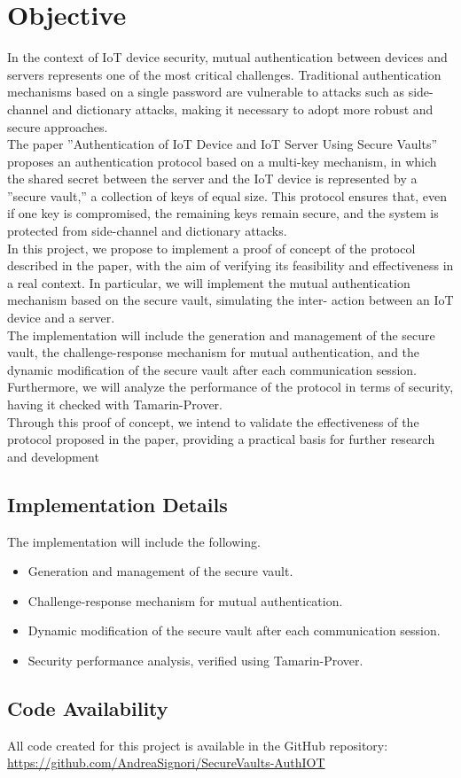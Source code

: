 \section{Objective}
In the context of IoT device security, mutual authentication between devices and servers represents one of the most critical challenges. Traditional authentication mechanisms based on a single password are vulnerable to attacks such as side- channel and dictionary attacks, making it necessary to adopt more robust and secure approaches. \\
The paper ”Authentication of IoT Device and IoT Server Using Secure Vaults” proposes an authentication protocol based on a multi-key mechanism, in which the shared secret between the server and the IoT device is represented by a ”secure vault,” a collection of keys of equal size. This protocol ensures that, even if one key is compromised, the remaining keys remain secure, and the system is protected from side-channel and dictionary attacks. \\ In this project, we propose to implement a proof of concept of the protocol described in the paper, with the aim of verifying its feasibility and effectiveness in a real context. In particular, we will implement the mutual authentication mechanism based on the secure vault, simulating the inter- action between an IoT device and a server. \\ The implementation will include the generation and management of the secure vault, the challenge-response mechanism for mutual authentication, and the dynamic modification of the secure vault after each communication session.\\ Furthermore, we will analyze the performance of the protocol in terms of security, having it checked with Tamarin-Prover. \\ Through this proof of concept, we intend to validate the effectiveness of the protocol proposed in the paper, providing a practical basis for further research and development

\subsection{Implementation Details}

The implementation will include the following.
\begin{itemize}
    \item Generation and management of the secure vault.
    \item Challenge-response mechanism for mutual authentication.
    \item Dynamic modification of the secure vault after each communication session.
    \item Security performance analysis, verified using Tamarin-Prover.
\end{itemize}

\subsection{Code Availability}

All code created for this project is available in the GitHub repository: \\ 
\href{https://github.com/AndreaSignori/SecureVaults-AuthIOT}{https://github.com/AndreaSignori/SecureVaults-AuthIOT}

